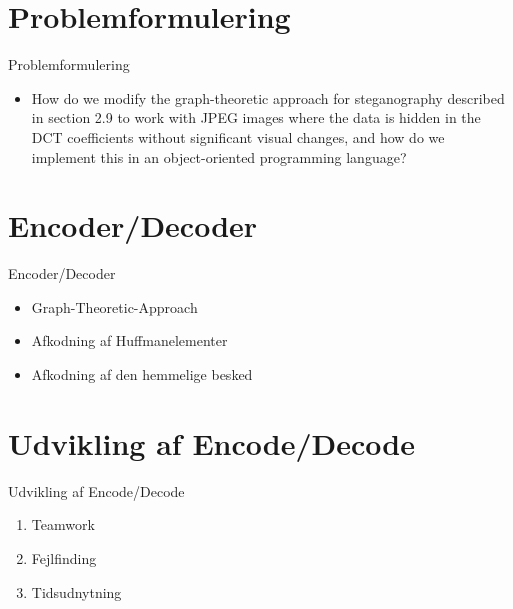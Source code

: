 \section{Problemformulering}
\begin{frame}{Problemformulering}{}
	\begin{itemize}
		\item How do we modify the graph-theoretic approach for steganography described in section 2.9 to work with JPEG images where the data is hidden in the DCT coefficients without significant visual changes, and how do we implement this in an object-oriented programming language?
	\end{itemize}
\end{frame}
\section{Encoder/Decoder}
\begin{frame}{Encoder/Decoder}{}
	\begin{itemize}
		\item Graph-Theoretic-Approach
		\item Afkodning af Huffmanelementer
		\item Afkodning af den hemmelige besked
	\end{itemize}
\end{frame}


\section{Udvikling af Encode/Decode}
\begin{frame}{Udvikling af Encode/Decode}{}
	\begin{enumerate}
		\item Teamwork
		\item Fejlfinding
		\item Tidsudnytning
	\end{enumerate}
\end{frame}


